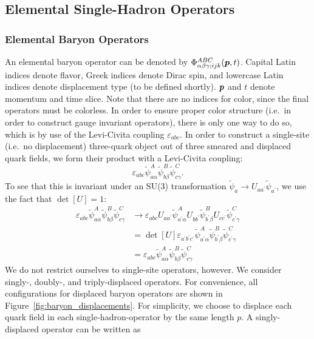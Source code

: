     \subsection{Elemental Single-Hadron Operators}
    \subsubsection{Elemental Baryon Operators}
    An elemental baryon operator can be denoted by $\Phi_{\alpha \beta \gamma; ijk}^{ABC}(\boldsymbol{p}, t)$. Capital Latin indices denote flavor, Greek indices denote Dirac spin, and lowercase Latin indices denote displacement type (to be defined shortly). $\boldsymbol{p}$ and $t$ denote momentum and time slice. Note that there are no indices for color, since the final operators must be colorless. In order to ensure proper color structure (i.e.\ in order to construct gauge invariant operators), there is only one way to do so, which is by use of the Levi-Civita coupling $\varepsilon_{abc}$. In order to construct a single-site (i.e.\ no displacement) three-quark object out of three smeared and displaced quark fields, we form their product with a Levi-Civita coupling:
    \begin{equation}
       \varepsilon_{a b c} \widetilde{\psi}_{a \alpha}^{A} \widetilde{\psi}_{b \beta}^{B} \widetilde{\psi}_{c \gamma}^{C}.
    \end{equation}
    To see that this is invariant under an SU(3) transformation $\widetilde\psi_a \rightarrow U_{a a^\prime} \widetilde\psi_{a^\prime}$, we use the fact that $\det[U] = 1$:
    \begin{equation}
        \begin{aligned}
            \varepsilon_{a b c} \widetilde{\psi}_{a \alpha}^{A} \widetilde{\psi}_{b \beta}^{B} \widetilde{\psi}_{c \gamma}^{C} &\rightarrow \varepsilon_{abc} U_{a a^\prime} \widetilde{\psi}_{a^\prime \alpha}^A U_{b b^\prime} \widetilde{\psi}_{b^\prime \beta}^B U_{c c^\prime} \widetilde{\psi}_{c^\prime \gamma}^C \\
            & = \det[U]\varepsilon_{a^\prime b^\prime c^\prime} \widetilde{\psi}_{a^\prime \alpha}^{A} \widetilde{\psi}_{b^\prime \beta}^{B} \widetilde{\psi}_{c^\prime \gamma}^{C} \\
            & = \varepsilon_{a b c} \widetilde{\psi}_{a \alpha}^{A} \widetilde{\psi}_{b \beta}^{B} \widetilde{\psi}_{c \gamma}^{C}
        \end{aligned}
    \end{equation}
    We do not restrict ourselves to single-site operators, however. We consider \mbox{singly-,} \mbox{doubly-,} and triply-displaced operators. For convenience, all configurations for displaced baryon operators are shown in Figure~\ref{fig:baryon_displacements}. For simplicity, we choose to displace each quark field in each single-hadron-operator by the same length $p$. A singly-displaced operator can be written as

